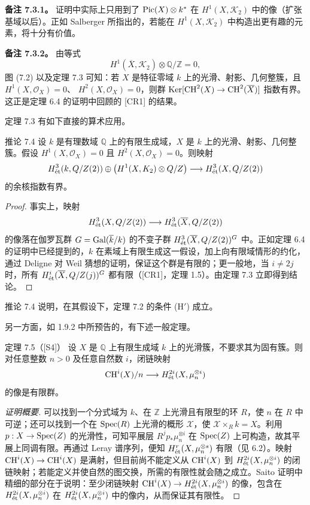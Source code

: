 \noindent\textbf{备注 7.3.1。} 证明中实际上只用到了 $\operatorname{Pic}(X)\otimes k^*$ 在 $H^1(X,\mathcal K_2)$ 中的像（扩张基域以后）。正如 Salberger 所指出的，若能在 $H^1(X,\mathcal K_2)$ 中构造出更有趣的元素，将十分有价值。

\noindent\textbf{备注 7.3.2。} 由等式
\[
 H^1(\overline X,\mathcal K_2)\otimes\mathbb Q/\mathbb Z=0,
\]
图 (7.2) 以及定理 7.3 可知：若 $X$ 是特征零域 $k$ 上的光滑、射影、几何整簇，且 $H^1(X,\mathcal O_X)=0$、
$H^2(X,\mathcal O_X)=0$，则群 $\operatorname{Ker}[\operatorname{CH}^2(X)\to\operatorname{CH}^2(\overline X)]$ 指数有界。这正是定理 6.4 的证明中回顾的 [CR1] 的结果。

定理 7.3 有如下直接的算术应用。
\begin{statement}{推论 7.4}
设 $k$ 是有理数域 $\mathbb Q$ 上的有限生成域，$X$ 是 $k$ 上的光滑、射影、几何整簇。假设 $H^1(X,\mathcal O_X)=0$ 且 $H^2(X,\mathcal O_X)=0$。则映射
\[
 H^3_{\mathrm{\acute et}}(k,Q/Z(2))\oplus
 \bigl(H^1(X,K_2)\otimes Q/Z\bigr)
 \longrightarrow H^3_{\mathrm{\acute et}}(X,Q/Z(2))
\]
的余核指数有界。
\end{statement}
\begin{proof}
事实上，映射
\[
 H^3_{\mathrm{\acute et}}(X,Q/Z(2))
 \longrightarrow H^3_{\mathrm{\acute et}}(\overline X,Q/Z(2))
\]
的像落在伽罗瓦群 $G=\operatorname{Gal}(\overline k/k)$ 的不变子群 $H^3_{\mathrm{\acute et}}(\overline X,Q/Z(2))^G$ 中。正如定理 6.4 的证明中已经提到的，$k$ 在素域上有限生成这一假设，加上向有限域情形的约化，通过 Deligne 对 Weil 猜想的证明，保证这个群是有限的；更一般地，当 $i\ne2j$ 时，所有 $H^i_{\mathrm{\acute et}}(\overline X,Q/Z(j))^G$ 都有限（[CR1]，定理 1.5）。由定理 7.3 立即得到结论。
\end{proof}

推论 7.4 说明，在其假设下，定理 7.2 的条件 (H$'$) 成立。

另一方面，如 1.9.2 中所预告的，有下述一般定理。
\begin{statement}{定理 7.5（[S4]）}
设 $X$ 是 $\mathbb Q$ 上有限生成域 $k$ 上的光滑簇，不要求其为固有簇。则对任意整数 $n>0$ 及任意自然数 $i$，闭链映射
\[
 \operatorname{CH}^i(X)/n\longrightarrow H^{2i}_{\mathrm{\acute et}}(X,\mu_n^{\otimes i})
\]
的像是有限群。
\end{statement}
\begin{proof}[证明概要]
可以找到一个分式域为 $k$、在 $\mathbb Z$ 上光滑且有限型的环 $R$，使 $n$ 在 $R$ 中可逆；还可以找到一个在 $\operatorname{Spec}(R)$ 上光滑的概形 $\mathcal X$，使 $\mathcal X\times_Rk=X$。利用 $p:X\to\operatorname{Spec}(Z)$ 的光滑性，可知平展层 $R^jp_*\mu_n^{\otimes i}$ 在 $\operatorname{Spec}(Z)$ 上可构造，故其平展上同调有限。再通过 Leray 谱序列，便知 $H^r_{\mathrm{\acute et}}(X,\mu_n^{\otimes s})$ 有限（见 6.2）。映射 $\operatorname{CH}^i(X)\to\operatorname{CH}^i(X)$ 是满射，但目前尚不能定义从 $\operatorname{CH}^i(X)$ 到 $H^{2i}_{\mathrm{\acute et}}(X,\mu_n^{\otimes i})$ 的闭链映射；若能定义并使自然的图交换，所需的有限性就会随之成立。Saito 证明中精细的部分在于说明：至少闭链映射 $\operatorname{CH}^i(X)\to H^{2i}_{\mathrm{\acute et}}(X,\mu_n^{\otimes i})$ 的像，包含在 $H^{2i}_{\mathrm{\acute et}}(X,\mu_n^{\otimes i})$ 在 $H^{2i}_{\mathrm{\acute et}}(X,\mu_n^{\otimes i})$ 中的像内，从而保证其有限性。
\end{proof}

